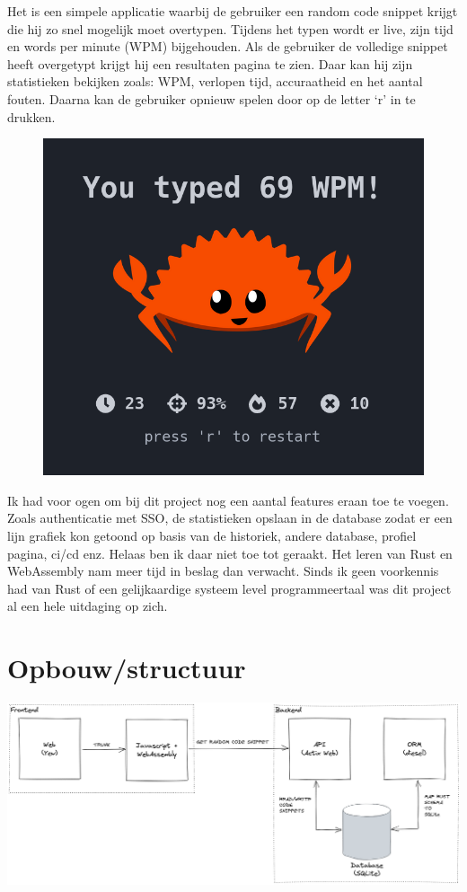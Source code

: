 Het is een simpele applicatie waarbij de gebruiker een random code snippet krijgt die hij zo snel
mogelijk moet overtypen. Tijdens het typen wordt er live, zijn tijd en words per minute (WPM)
bijgehouden. Als de gebruiker de volledige snippet heeft overgetypt krijgt hij een resultaten pagina
te zien. Daar kan hij zijn statistieken bekijken zoals: WPM, verlopen tijd, accuraatheid en het
aantal fouten. Daarna kan de gebruiker opnieuw spelen door op de letter ‘r’ in te drukken. \\
\begin{figure}
  \centering
  \includegraphics[width=0.9\linewidth]{./figures/result.png}
\end{figure}


Ik had voor ogen om bij dit project nog een aantal features eraan toe te voegen. Zoals authenticatie
met SSO, de statistieken opslaan in de database zodat er een lijn grafiek kon getoond op basis van
de historiek, andere database, profiel pagina, ci/cd enz. Helaas ben ik daar niet toe tot geraakt.
Het leren van Rust en WebAssembly nam meer tijd in beslag dan verwacht. Sinds ik geen voorkennis had
van Rust of een gelijkaardige systeem level programmeertaal was dit project al een hele uitdaging op
zich.

\clearpage

\section{Opbouw/structuur}

\includegraphics[width=\textwidth]{./figures/structuur.png}


